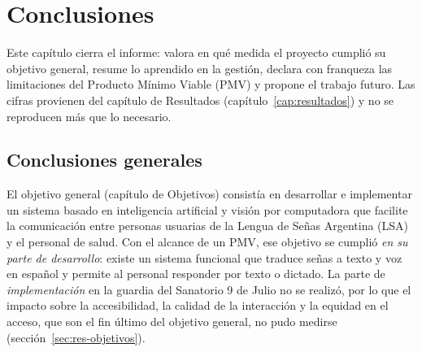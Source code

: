 \chapter{Conclusiones}\label{cap:conclusiones}

Este capítulo cierra el informe: valora en qué medida el proyecto cumplió su objetivo general, resume lo aprendido en la gestión, declara con franqueza las limitaciones del Producto Mínimo Viable (PMV) y propone el trabajo futuro. Las cifras provienen del capítulo de Resultados (capítulo~\ref{cap:resultados}) y no se reproducen más que lo necesario.

\section{Conclusiones generales}\label{sec:concl-generales}

El objetivo general (capítulo de Objetivos) consistía en desarrollar e implementar un sistema basado en inteligencia artificial y visión por computadora que facilite la comunicación entre personas usuarias de la Lengua de Señas Argentina (LSA) y el personal de salud. Con el alcance de un PMV, ese objetivo se cumplió \emph{en su parte de desarrollo}: existe un sistema funcional que traduce señas a texto y voz en español y permite al personal responder por texto o dictado. La parte de \emph{implementación} en la guardia del Sanatorio 9 de Julio no se realizó, por lo que el impacto sobre la accesibilidad, la calidad de la interacción y la equidad en el acceso, que son el fin último del objetivo general, no pudo medirse (sección~\ref{sec:res-objetivos}).

